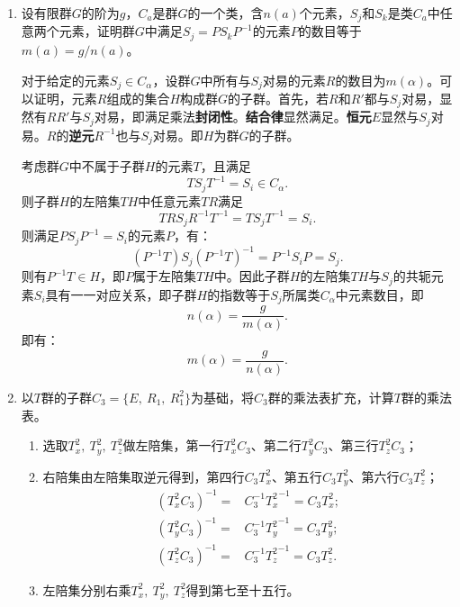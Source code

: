 \documentclass[reqno,a4paper,12pt]{amsart}
\begin{document}
\begin{enumerate}[1.]
\item 设有限群$G$的阶为$g$，$C_a$是群$G$的一个类，含$n(a)$个元素，$S_j$和$S_k$是类$C_a$中任意两个元素，证明群$G$中满足$S_j = PS_kP^{-1}$的元素$P$的数目等于$m(a) = g/n(a)$。
\begin{tcolorbox}[breakable, colback = black!5!white, colframe = black]
对于给定的元素$S_j \in C_\alpha$，设群$G$中所有与$S_j$对易的元素$R$的数目为$m(\alpha)$。可以证明，元素$R$组成的集合$H$构成群$G$的子群。首先，若$R$和$R'$都与$S_j$对易，显然有$RR'$与$S_j$对易，即满足乘法\textbf{封闭性}。\textbf{结合律}显然满足。\textbf{恒元}$E$显然与$S_j$对易。$R$的\textbf{逆元}$R^{-1}$也与$S_j$对易。即$H$为群$G$的子群。

考虑群$G$中不属于子群$H$的元素$T$，且满足
\[
	TS_j T^{-1} = S_i \in C_\alpha.
\]
则子群$H$的左陪集$TH$中任意元素$TR$满足
\[
	TR S_j R^{-1} T^{-1} = T S_j T^{-1} = S_i.
\]
则满足$PS_jP^{-1} = S_i$的元素$P$，有：
\[
	(P^{-1} T) S_j (P^{-1} T)^{-1} = P^{-1} S_i P = S_j.
\]
则有$P^{-1}T \in H$，即$P$属于左陪集$TH$中。因此子群$H$的左陪集$TH$与$S_j$的共轭元素$S_i$具有一一对应关系，即子群$H$的指数等于$S_j$所属类$C_\alpha$中元素数目，即
\[
	n(\alpha) = \frac{g}{m(\alpha)}.
\]
即有：
\[
	m(\alpha) = \frac{g}{n(\alpha)}.
\]
\end{tcolorbox}

\item 以$T$群的子群$C_3 = \{ E, \ R_1, \ R_1^2 \}$为基础，将$C_3$群的乘法表扩充，计算$T$群的乘法表。

\begin{tcolorbox}[breakable, colback = black!5!white, colframe = black]
\begin{enumerate}[(1)]
\item 选取$T_x^2, \ T_y^2, \ T_z^2$做左陪集，第一行$T_x^2C_3$、第二行$T_y^2C_3$、第三行$T_z^2C_3$；

\item 右陪集由左陪集取逆元得到，第四行$C_3T_x^2$、第五行$C_3T_y^2$、第六行$C_3T_z^2$；
\begin{align*}
	(T_x^2C_3)^{-1} =& C_3^{-1} {T_x^2}^{-1} = C_3 T_x^2; \\ 
	(T_y^2C_3)^{-1} =& C_3^{-1} {T_y^2}^{-1} = C_3 T_y^2; \\
	(T_z^2C_3)^{-1} =& C_3^{-1} {T_z^2}^{-1} = C_3 T_z^2.
\end{align*}

\item 左陪集分别右乘$T_x^2, \ T_y^2, \ T_z^2$得到第七至十五行。

\end{enumerate}


\end{tcolorbox}
\end{enumerate}
\end{document}
